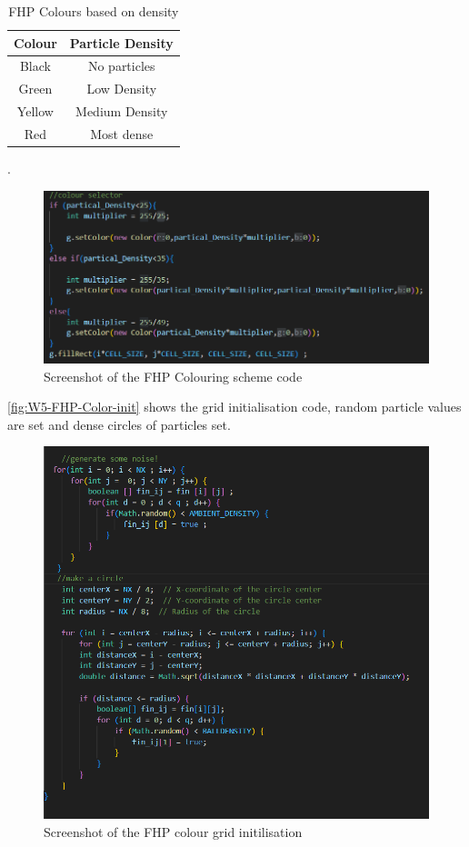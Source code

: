 \begin{table}[htbp]
  \centering
  \renewcommand{\arraystretch}{1.2}
  \begin{tabular}{|c|c|}
    \hline
    \textbf{Colour} & \textbf{Particle Density} \\
    \hline
    Black & No particles \\
    \hline
    Green & Low Density \\
    \hline
    Yellow & Medium Density \\
    \hline
    Red & Most dense \\
    \hline
  \end{tabular}
  \caption{FHP Colours based on density}
  \label{tab:w5-colour-table}
\end{table}
.
\begin{figure}[H] 
    \centering
    \includegraphics[width=0.9\columnwidth]{Figures/Week 5/Color/FHP Color color code.png}
    \caption{Screenshot of the FHP Colouring scheme code}
    \label{fig:W5-FHP-Color-code}
\end{figure}

\autoref{fig:W5-FHP-Color-init} shows the grid initialisation code, random particle values are set and dense circles of particles set.

\begin{figure}[H] 
    \centering
    \includegraphics[width=0.9\columnwidth]{Figures/Week 5/Color/FHP color init.png}
    \caption{Screenshot of the FHP colour grid initilisation}
    \label{fig:W5-FHP-Color-init}
\end{figure}

